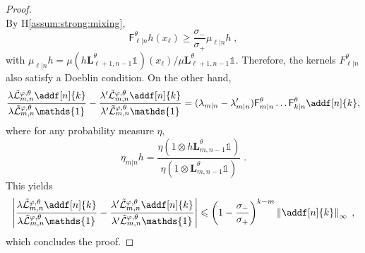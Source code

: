 \documentclass{article}
\newcommand{\1}{\mathbbm{1}}
\newcommand{\uk}[1]{\mathbf{L}_{#1}}
\def\1{\mathds{1}}
\newcommand{\eqsp}{\;}
\begin{document}
\begin{proof}
$$$$
By H\ref{assum:strong:mixing}, 
$$
 \mathsf{F}^\theta_{\ell|n}h(x_\ell) \geqslant \frac{\sigma_-}{\sigma_+}\mu_{\ell|n}h\eqsp,
$$
with $\mu_{\ell|n}h = \mu(h\uk{\ell+1, n-1}^\theta\1_{})(x_\ell) / \mu\uk{\ell+1, n-1}^\theta\1_{}$. Therefore, the kernels $ F^\theta_{\ell|n}$ also satisfy a Doeblin condition. On the other hand,
$$
\frac{\lambda\tilde{\mathcal{L}}^{\varphi,\theta}_{m, n} \addf[n]{k}}{\lambda\tilde{\mathcal{L}}^{\varphi,\theta}_{m, n} \1_{}} - \frac{\lambda'\tilde{\mathcal{L}}^{\varphi,\theta}_{m, n} \addf[n]{k}}{\lambda'\tilde{\mathcal{L}}^{\varphi,\theta}_{m, n} \1_{}} = (\lambda_{m|n} - \lambda'_{m|n})\mathsf{F}^\theta_{m|n}\ldots \mathsf{F}^\theta_{k|n}\addf[n]{k},
$$
where for any probability measure $\eta$,
$$
\eta_{m|n}h = \frac{\eta(1\otimes h\uk{m, n-1}^\theta\1_{})}{\eta(1\otimes \uk{m, n-1}^\theta\1_{})}\eqsp.
$$
This yields
$$
\left|\frac{\lambda\tilde{\mathcal{L}}^{\varphi,\theta}_{m, n} \addf[n]{k}}{\lambda\tilde{\mathcal{L}}^{\varphi,\theta}_{m, n} \1_{}} - \frac{\lambda'\tilde{\mathcal{L}}^{\varphi,\theta}_{m, n} \addf[n]{k}}{\lambda'\tilde{\mathcal{L}}^{\varphi,\theta}_{m, n} \1_{}}\right|\leqslant  \left(1-\frac{\sigma_-}{\sigma_+}\right)^{k-m}\left\|\addf[n]{k}\right\|_\infty\eqsp,
$$
which concludes the proof.
 
\end{proof}
\end{document}
